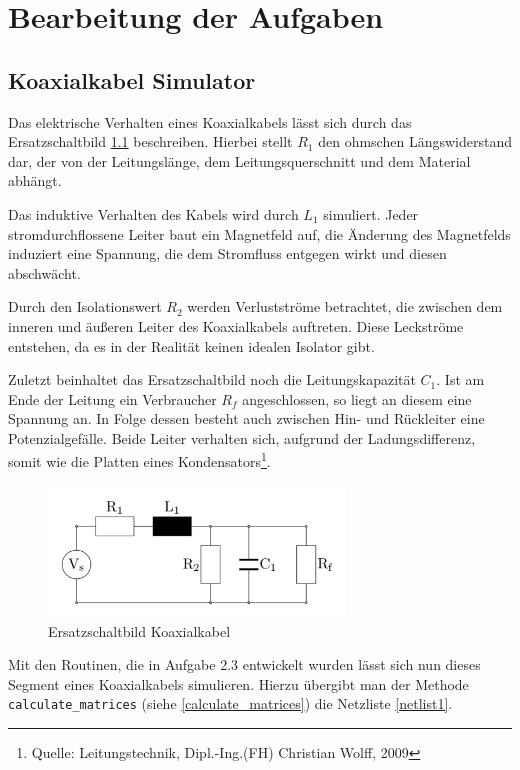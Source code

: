 \chapter{Bearbeitung der Aufgaben}
\section{Koaxialkabel Simulator}\label{sec:ag3_1}

Das elektrische Verhalten eines Koaxialkabels lässt sich durch das Ersatzschaltbild \ref{koaxialkabel1} beschreiben. Hierbei stellt $R_1$ den ohmschen Längswiderstand dar, der von der Leitungslänge, dem Leitungsquerschnitt und dem Material abhängt.

Das induktive Verhalten des Kabels wird durch $L_1$ simuliert. Jeder stromdurchflossene Leiter baut ein Magnetfeld auf, die Änderung des Magnetfelds induziert eine Spannung, die dem Stromfluss entgegen wirkt und diesen abschwächt.

Durch den Isolationswert $R_2$ werden Verlustströme betrachtet, die zwischen dem inneren und äußeren Leiter des Koaxialkabels auftreten. Diese Leckströme entstehen, da es in der Realität keinen idealen Isolator gibt.

Zuletzt beinhaltet das Ersatzschaltbild noch die Leitungskapazität $C_1$. Ist am Ende der Leitung ein Verbraucher $R_f$ angeschlossen, so liegt an diesem eine Spannung an. In Folge dessen besteht auch zwischen Hin- und Rückleiter eine Potenzialgefälle. Beide Leiter verhalten sich, aufgrund der Ladungsdifferenz, somit wie die Platten eines Kondensators\footnote{Quelle: Leitungstechnik, Dipl.-Ing.(FH) Christian Wolff, 2009}. 

\begin{figure}[h]
	\centering
	\includegraphics[width=0.7\textwidth]{data/Koaxialkabel1}
	\caption{Ersatzschaltbild Koaxialkabel}
	\label{koaxialkabel1}
\end{figure}

Mit den Routinen, die in Aufgabe 2.3 entwickelt wurden lässt sich nun dieses Segment eines Koaxialkabels simulieren. Hierzu übergibt man der Methode \texttt{calculate\_matrices} (siehe \ref{calculate_matrices}) die Netzliste \ref{netlist1}.

